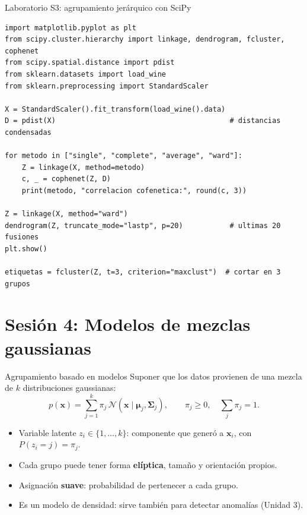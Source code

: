 \documentclass[aspectratio=169,11pt]{beamer}
\newcommand{\x}{\bm{x}}
\newcommand{\muv}{\bm{\mu}}
\newcommand{\N}{\mathcal{N}}
\begin{document}
\begin{frame}[fragile]{Laboratorio S3: agrupamiento jerárquico con SciPy}
\begin{lstlisting}
import matplotlib.pyplot as plt
from scipy.cluster.hierarchy import linkage, dendrogram, fcluster, cophenet
from scipy.spatial.distance import pdist
from sklearn.datasets import load_wine
from sklearn.preprocessing import StandardScaler

X = StandardScaler().fit_transform(load_wine().data)
D = pdist(X)                                         # distancias condensadas

for metodo in ["single", "complete", "average", "ward"]:
    Z = linkage(X, method=metodo)
    c, _ = cophenet(Z, D)
    print(metodo, "correlacion cofenetica:", round(c, 3))

Z = linkage(X, method="ward")
dendrogram(Z, truncate_mode="lastp", p=20)           # ultimas 20 fusiones
plt.show()

etiquetas = fcluster(Z, t=3, criterion="maxclust")  # cortar en 3 grupos
\end{lstlisting}
\end{frame}

\section{Sesión 4: Modelos de mezclas gaussianas}

\begin{frame}{Agrupamiento basado en modelos}
  Suponer que los datos provienen de una \alert{mezcla} de $k$ distribuciones gaussianas:
  \[
    p(\x) = \sum_{j=1}^{k} \pi_j\, \N(\x \mid \muv_j, \bm{\Sigma}_j),
    \qquad \pi_j \ge 0,\quad \sum_j \pi_j = 1 .
  \]
  \begin{itemize}
    \item Variable latente $z_i\in\{1,\dots,k\}$: componente que generó a $\x_i$, con $P(z_i=j)=\pi_j$.
    \item Cada grupo puede tener forma \textbf{elíptica}, tamaño y orientación propios.
    \item Asignación \textbf{suave}: probabilidad de pertenecer a cada grupo.
    \item Es un modelo de densidad: sirve también para detectar anomalías (Unidad 3).
  \end{itemize}
\end{frame}
\end{document}
